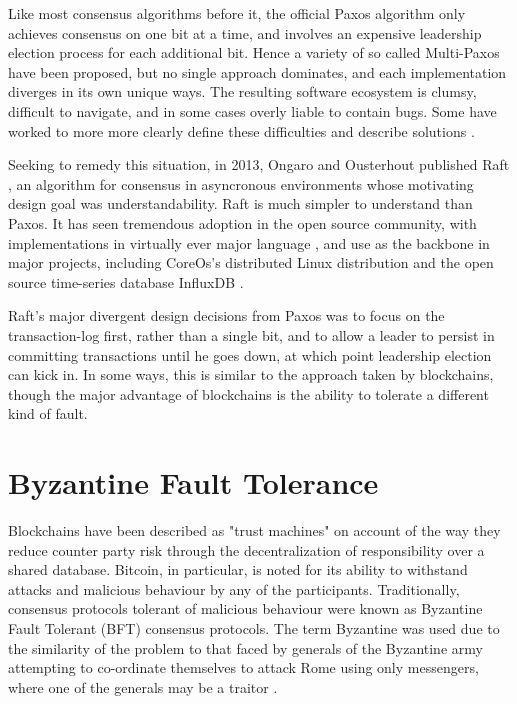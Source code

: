 Like most consensus algorithms before it, the official Paxos algorithm only achieves consensus on one bit at a time,
and involves an expensive leadership election process for each additional bit. 
Hence a variety of so called Multi-Paxos have been proposed, but no single approach dominates, 
and each implementation diverges in its own unique ways. 
The resulting software ecosystem is clumsy, difficult to navigate, and in some cases overly liable to contain bugs.
Some have worked to more more clearly define these difficulties 
and describe solutions \cite{chandra2007paxos}.

Seeking to remedy this situation, in 2013, Ongaro and Ousterhout published Raft \cite{raft},
an algorithm for consensus in asyncronous environments whose motivating design goal was understandability.
Raft is much simpler to understand than Paxos.
It has seen tremendous adoption in the open source community, 
with implementations in virtually ever major language \cite{raft.github.io},
and use as the backbone in major projects, 
including CoreOs's distributed Linux distribution \cite{coreos_raft} and the open source time-series database InfluxDB \cite{influxdb_raft}.

Raft's major divergent design decisions from Paxos was to focus on the transaction-log first, rather than a single bit,
and to allow a leader to persist in committing transactions until he goes down, 
at which point leadership election can kick in. 
In some ways, this is similar to the approach taken by blockchains, 
though the major advantage of blockchains is the ability to tolerate a different kind of fault.

\section{Byzantine Fault Tolerance}

Blockchains have been described as "trust machines" \cite{economist_blockchains} on account of the way they reduce counter party risk through the decentralization of responsibility over a shared database.
Bitcoin, in particular, is noted for its ability to withstand attacks and malicious behaviour by any of the participants. 
Traditionally, consensus protocols tolerant of malicious behaviour were known as Byzantine Fault Tolerant (BFT) consensus protocols.
The term Byzantine was used due to the similarity of the problem to that faced by generals of the Byzantine army attempting to co-ordinate themselves to attack Rome using only messengers,
where one of the generals may be a traitor \cite{lamport1982Byzantine}.

